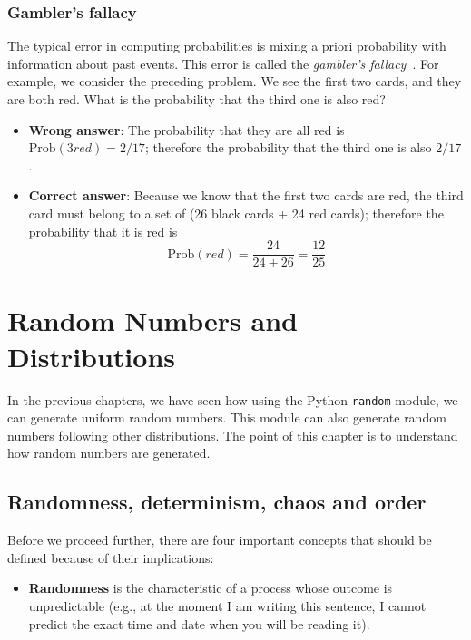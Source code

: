 \documentclass[justified,sixbynine]{tufte-book}
\def\ft{\small\tt}
\theoremstyle{plain}%
\theoremstyle{definition}
\theoremstyle{remark}
\begin{document}
\begin{fullwidth}
\goodbreak\subsection{Gambler's fallacy}

The typical error in computing probabilities is mixing a priori probability
with information about past events.
This error is called the {\it gambler's fallacy}~\cite{gambler}.
For example, we consider the preceding problem. We see the first two cards, and they are both red. What is the
probability that the third one is also red?

\begin{itemize}
\item  {\bf Wrong answer}: The probability that they are all red is $%
\textrm{Prob}(3red)=2/17$; therefore the probability that the third one is also $2/17$.

\item  {\bf Correct answer}: Because we know that the first two cards are red, the third card must belong to a set of (26 black cards + 24 red cards);
therefore the probability that it is red is
\begin{equation}
\textrm{Prob}(red)=\frac{24}{24+26}=\frac{12}{25}
\end{equation}
\end{itemize}




\chapter{Random Numbers and Distributions}

In the previous chapters, we have seen how using the Python {\ft random} module, we can generate uniform random numbers. This module can also
generate random numbers following other distributions.
The point of this chapter is to understand how random numbers are generated.

\goodbreak\section{Randomness, determinism, chaos and order}

Before we proceed further, there are four important concepts that should be defined because of their implications:

\begin{itemize}
\item  {\bf Randomness} is the characteristic of a process whose outcome is
unpredictable (e.g., at the moment I am writing this sentence, I cannot
predict the exact time and date when you will be reading it).


\end{itemize}
\end{fullwidth}
\end{document}
